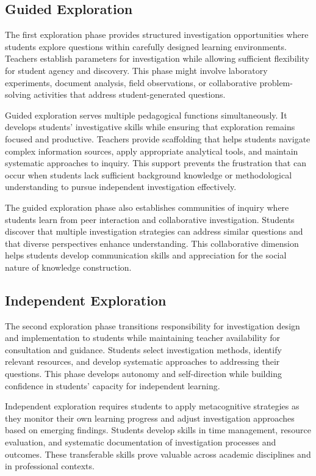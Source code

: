 \documentclass[
  Letterpaper,
]{scrbook}
\begin{document}
\subsection{Guided Exploration}\label{guided-exploration}

The first exploration phase provides structured investigation
opportunities where students explore questions within carefully designed
learning environments. Teachers establish parameters for investigation
while allowing sufficient flexibility for student agency and discovery.
This phase might involve laboratory experiments, document analysis,
field observations, or collaborative problem-solving activities that
address student-generated questions.

Guided exploration serves multiple pedagogical functions simultaneously.
It develops students' investigative skills while ensuring that
exploration remains focused and productive. Teachers provide scaffolding
that helps students navigate complex information sources, apply
appropriate analytical tools, and maintain systematic approaches to
inquiry. This support prevents the frustration that can occur when
students lack sufficient background knowledge or methodological
understanding to pursue independent investigation effectively.

The guided exploration phase also establishes communities of inquiry
where students learn from peer interaction and collaborative
investigation. Students discover that multiple investigation strategies
can address similar questions and that diverse perspectives enhance
understanding. This collaborative dimension helps students develop
communication skills and appreciation for the social nature of knowledge
construction.

\subsection{Independent Exploration}\label{independent-exploration}

The second exploration phase transitions responsibility for
investigation design and implementation to students while maintaining
teacher availability for consultation and guidance. Students select
investigation methods, identify relevant resources, and develop
systematic approaches to addressing their questions. This phase develops
autonomy and self-direction while building confidence in students'
capacity for independent learning.

Independent exploration requires students to apply metacognitive
strategies as they monitor their own learning progress and adjust
investigation approaches based on emerging findings. Students develop
skills in time management, resource evaluation, and systematic
documentation of investigation processes and outcomes. These
transferable skills prove valuable across academic disciplines and in
professional contexts.
\end{document}
